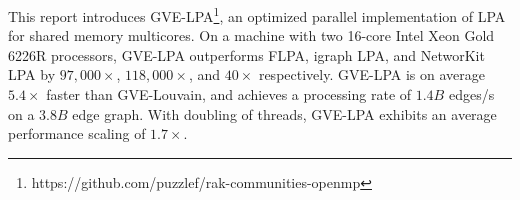 This report introduces GVE-LPA\footnote{https://github.com/puzzlef/rak-communities-openmp}, an optimized parallel implementation of LPA for shared memory multicores. On a machine with two 16-core Intel Xeon Gold 6226R processors, GVE-LPA outperforms FLPA, igraph LPA, and NetworKit LPA by $97,000\times$, $118,000\times$, and $40\times$ respectively. GVE-LPA is on average $5.4\times$ faster than GVE-Louvain, and achieves a processing rate of $1.4 B$ edges/s on a $3.8 B$ edge graph. With doubling of threads, GVE-LPA exhibits an average performance scaling of $1.7\times$.








